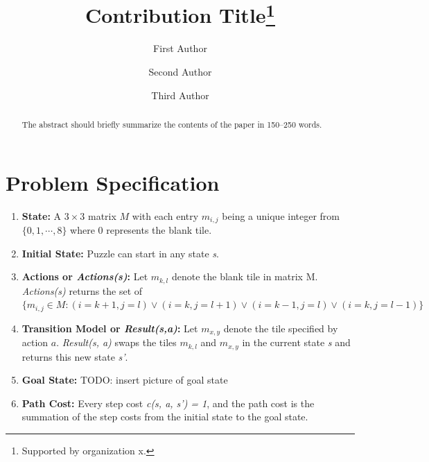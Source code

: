 \documentclass[runningheads]{llncs}
\begin{document}
%
\title{Contribution Title\thanks{Supported by organization x.}}
%
%
\author{First Author \and
Second Author \and
Third Author}
%
%
%
\maketitle              %
%
\begin{abstract}
The abstract should briefly summarize the contents of the paper in
150--250 words.

\end{abstract}
%
%
%
\section{Problem Specification}
\begin{enumerate}
    \item \textbf{State:} A \( 3 \times 3 \) matrix \( M \) with each entry \( m_{i, j} \) being a unique integer from \( \{0, 1, \cdots, 8 \} \) where 0 represents the blank tile.
    \item \textbf{Initial State:} Puzzle can start in any state \textit{s}.
    \item \textbf{Actions or \textit{Actions(s)}:} Let \( m_{k,l} \) denote the blank tile in matrix M. \textit{Actions(s)} returns the set of \(\{ m_{i,j} \in M: (i=k+1, j=l) \vee (i=k, j=l+1) \vee (i=k-1, j=l) \vee (i=k, j=l-1) \}\)
    \item \textbf{Transition Model or \textit{Result(s,a)}:} Let \( m_{x, y} \) denote the tile specified by action \( a \). \textit{Result(s, a)} swaps the tiles \( m_{k,l} \) and \( m_{x,y} \) in the current state \textit{s} and returns this new state \textit{s'}.
    \item \textbf{Goal State:} TODO: insert picture of goal state
    \item \textbf{Path Cost:} Every step cost \textit{c(s, a, s') = 1}, and the path cost is the summation of the step costs from the initial state to the goal state.
\end{enumerate}
\end{document}
